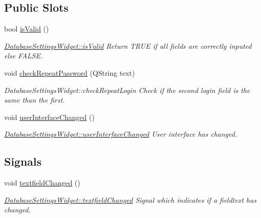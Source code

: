 \subsection*{Public Slots}
\begin{DoxyCompactItemize}
\item 
bool \hyperlink{classGui_1_1Widgets_1_1DatabaseSettingsWidget_a8b7f1184a885ca63edce7957b74751c6}{is\+Valid} ()
\begin{DoxyCompactList}\small\item\em \hyperlink{classGui_1_1Widgets_1_1DatabaseSettingsWidget_a8b7f1184a885ca63edce7957b74751c6}{Database\+Settings\+Widget\+::is\+Valid} Return T\+R\+U\+E if all fields are correctly inputed else F\+A\+L\+S\+E. \end{DoxyCompactList}\item 
\hypertarget{classGui_1_1Widgets_1_1DatabaseSettingsWidget_a99bb50cd3d4eb68c5b8d9b20a983a605}{}void \hyperlink{classGui_1_1Widgets_1_1DatabaseSettingsWidget_a99bb50cd3d4eb68c5b8d9b20a983a605}{check\+Repeat\+Password} (Q\+String text)\label{classGui_1_1Widgets_1_1DatabaseSettingsWidget_a99bb50cd3d4eb68c5b8d9b20a983a605}

\begin{DoxyCompactList}\small\item\em Database\+Settings\+Widget\+::check\+Repeat\+Login Check if the second login field is the same than the first. \end{DoxyCompactList}\item 
\hypertarget{classGui_1_1Widgets_1_1DatabaseSettingsWidget_a063c346b830524fb1f96f32984fb5493}{}void \hyperlink{classGui_1_1Widgets_1_1DatabaseSettingsWidget_a063c346b830524fb1f96f32984fb5493}{user\+Interface\+Changed} ()\label{classGui_1_1Widgets_1_1DatabaseSettingsWidget_a063c346b830524fb1f96f32984fb5493}

\begin{DoxyCompactList}\small\item\em \hyperlink{classGui_1_1Widgets_1_1DatabaseSettingsWidget_a063c346b830524fb1f96f32984fb5493}{Database\+Settings\+Widget\+::user\+Interface\+Changed} User interface has changed. \end{DoxyCompactList}\end{DoxyCompactItemize}
\subsection*{Signals}
\begin{DoxyCompactItemize}
\item 
\hypertarget{classGui_1_1Widgets_1_1DatabaseSettingsWidget_a6947626c7bb6807572e0a49ef2f53c70}{}void \hyperlink{classGui_1_1Widgets_1_1DatabaseSettingsWidget_a6947626c7bb6807572e0a49ef2f53c70}{textfield\+Changed} ()\label{classGui_1_1Widgets_1_1DatabaseSettingsWidget_a6947626c7bb6807572e0a49ef2f53c70}

\begin{DoxyCompactList}\small\item\em \hyperlink{classGui_1_1Widgets_1_1DatabaseSettingsWidget_a6947626c7bb6807572e0a49ef2f53c70}{Database\+Settings\+Widget\+::textfield\+Changed} Signal which indicates if a fieldtext has changed. \end{DoxyCompactList}\end{DoxyCompactItemize}
